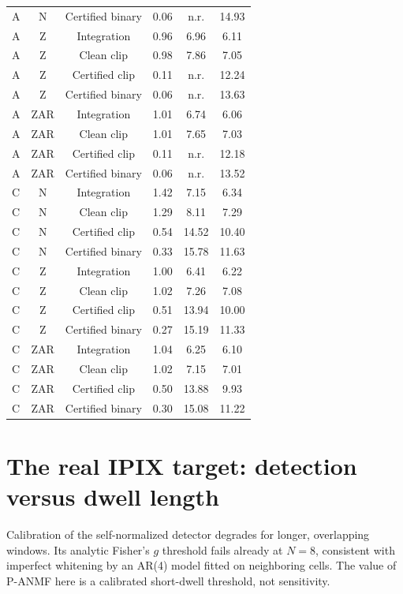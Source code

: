 \documentclass[10pt]{article}
\begin{document}
\begin{table}[htbp]
\begin{tabular}{lccccc}
A & N & Certified binary & 0.06 & n.r. & 14.93 \\
A & Z & Integration & 0.96 & 6.96 & 6.11 \\
A & Z & Clean clip & 0.98 & 7.86 & 7.05 \\
A & Z & Certified clip & 0.11 & n.r. & 12.24 \\
A & Z & Certified binary & 0.06 & n.r. & 13.63 \\
A & ZAR & Integration & 1.01 & 6.74 & 6.06 \\
A & ZAR & Clean clip & 1.01 & 7.65 & 7.03 \\
A & ZAR & Certified clip & 0.11 & n.r. & 12.18 \\
A & ZAR & Certified binary & 0.06 & n.r. & 13.52 \\
C & N & Integration & 1.42 & 7.15 & 6.34 \\
C & N & Clean clip & 1.29 & 8.11 & 7.29 \\
C & N & Certified clip & 0.54 & 14.52 & 10.40 \\
C & N & Certified binary & 0.33 & 15.78 & 11.63 \\
C & Z & Integration & 1.00 & 6.41 & 6.22 \\
C & Z & Clean clip & 1.02 & 7.26 & 7.08 \\
C & Z & Certified clip & 0.51 & 13.94 & 10.00 \\
C & Z & Certified binary & 0.27 & 15.19 & 11.33 \\
C & ZAR & Integration & 1.04 & 6.25 & 6.10 \\
C & ZAR & Clean clip & 1.02 & 7.15 & 7.01 \\
C & ZAR & Certified clip & 0.50 & 13.88 & 9.93 \\
C & ZAR & Certified binary & 0.30 & 15.08 & 11.22 \\
\bottomrule
\end{tabular}
\end{table}

\section{The real IPIX target: detection versus dwell length}\label{sup:target}
\begin{table}[h]
\centering\small
\caption{Real IPIX target (primary cell, test thirds, 56 units): mean $P_{\rm d}$ at design $P_{\rm fa}=10^{-3}$ versus dwell $N$. In parentheses: measured clutter $P_{\rm fa}$ ($\times10^{-3}$). P-ANMF with Fisher's $g$ uses the analytic threshold.}
\label{tab:target}

\end{table}
Calibration of the self-normalized detector degrades for longer, overlapping windows. Its analytic Fisher's $g$ threshold fails already at $N=8$, consistent with imperfect whitening by an AR(4) model fitted on neighboring cells. The value of P-ANMF here is a calibrated short-dwell threshold, not sensitivity.
\end{document}
